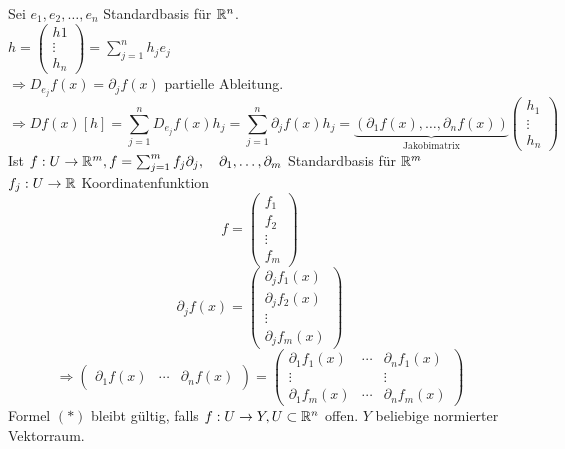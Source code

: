 \documentclass[../ana2.tex]{subfiles}
\begin{document}
Sei \( e_1, e_2, \dots, e_n \) Standardbasis für \(\mathbb{R}^n\).\\
\( h = \begin{pmatrix}
    h1 \\
    \vdots\\
    h_n
\end{pmatrix} = \sum_{j=1}^n h_je_j \) \\
\( \Rightarrow D_{e_j}f(x) = \partial_j f(x) \) partielle Ableitung.
\[ \Rightarrow Df(x)[h] = \sum_{j=1}^n D_{e_j}f(x)h_j 
= \sum_{j=1}^n \partial_j f(x)h_j
= \underbrace{(\partial_1f(x), \dots, \partial_n f(x))}_{\text{Jakobimatrix}}
\begin{pmatrix}
    h_1 \\
    \vdots \\
    h_n    
\end{pmatrix} \tag{*}\]
Ist \( f:U\rightarrow \mathbb{R}^m, f = \sum_{j=1}^m f_j \partial_j, \quad 
\partial_1, \ldots, \partial_m \) Standardbasis für \( \mathbb{R}^m \) \\
\( f_j:U\rightarrow \mathbb{R} \) Koordinatenfunktion
\[ f = \begin{pmatrix}
    f_1 \\
    f_2 \\
    \vdots \\
    f_m
\end{pmatrix} \]
\[ \partial_j f(x) = \begin{pmatrix}
    \partial_j f_1(x) \\
    \partial_j f_2(x) \\
    \vdots \\
    \partial_j f_m(x)
\end{pmatrix} \]
\[ \Rightarrow \begin{pmatrix}
    \partial_1 f(x) & \cdots &\partial_n f(x)
\end{pmatrix} 
= \begin{pmatrix}
    \partial_1 f_1(x) & \cdots & \partial_n f_1(x) \\
    \vdots & & \vdots \\
    \partial_1 f_m(x) & \cdots & \partial_n f_m(x)
\end{pmatrix} \]
Formel \((*)\) bleibt gültig, falls \( f:U\rightarrow Y, U \subset \mathbb{R}^n \)
offen. \( Y\) beliebige normierter Vektorraum. 
\end{document}
